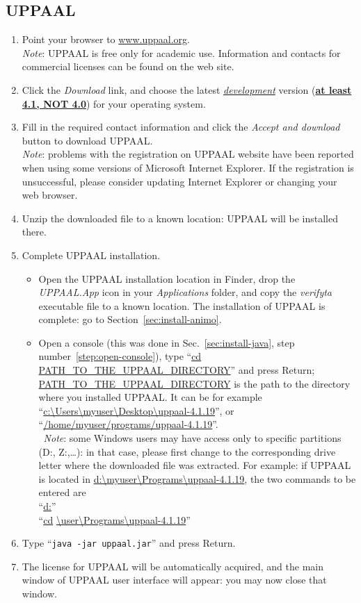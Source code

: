 \documentclass{article}
\newcommand{\winsymbol}{\raisebox{-0.8ex}{\pgfuseimage{win-logo}}}
\newcommand{\macsymbol}{\raisebox{-0.5ex}{\pgfuseimage{mac-logo}}}
\newcommand{\linuxsymbol}{\raisebox{-0.8ex}{\pgfuseimage{linux-logo}}}
\newcommand{\macpc}[2]{\begin{itemize}
    \item[\macsymbol] #1
    \item[\winsymbol\ \  \linuxsymbol] #2
\end{itemize}}
\begin{document}
\subsection{UPPAAL}\label{sec:install-uppaal}
\begin{enumerate}
\item Point your browser to \url{www.uppaal.org}.\\
\emph{Note}: UPPAAL is free only for
academic use. Information and contacts for commercial licenses can be found on the web site.
\item Click the \emph{Download} link, and choose the latest \underline{\emph{development}} version (\underline{\bf at least 4.1, NOT 4.0}) for your operating system.
\item Fill in the required contact information and click the \emph{Accept and download} button to download UPPAAL.\\
\emph{Note}: problems with the registration on UPPAAL website have been reported when using some versions of Microsoft Internet Explorer.
If the registration is unsuccessful, please consider updating Internet Explorer or changing your web browser.
\item\label{step:unzip-uppaal} Unzip the downloaded file to a known location: UPPAAL will be installed there.
\item\label{step:mac-install-uppaal} Complete UPPAAL installation. \macpc{Open the UPPAAL installation location in Finder,
drop the \emph{UPPAAL.App} icon in your \emph{Applications} folder,
and copy the \emph{verifyta} executable file to a known location. The installation of UPPAAL is complete:
go to Section~\ref{sec:install-animo}.}{Open a console (this was done in Sec.~\ref{sec:install-java}, step
number~\ref{step:open-console}), type ``\url{cd} \url{PATH_TO_THE_UPPAAL_DIRECTORY}'' and press Return;
\url{PATH_TO_THE_UPPAAL_DIRECTORY} is the path to the directory where you installed UPPAAL. It can be for example
``\url{c:\Users\myuser\Desktop\uppaal-4.1.19}'',
 or
``\url{/home/myuser/programs/uppaal-4.1.19}''.\\
\winsymbol\ \emph{Note}: some Windows users may have access only to specific partitions (D:, Z:,\dots): in that case,
please first change to the corresponding
drive letter where the downloaded file was extracted. For example: if UPPAAL is located in \url{d:\myuser\Programs\uppaal-4.1.19},
the two commands to be entered are\\
``\url{d:}''\\
``\url{cd} \url{\user\Programs\uppaal-4.1.19}''}
\item Type ``{\tt java -jar uppaal.jar}'' and press Return.
\item The license for UPPAAL will be automatically acquired, and the main window of UPPAAL user interface will appear: %
you may now close that window.
\end{enumerate}
\end{document}
